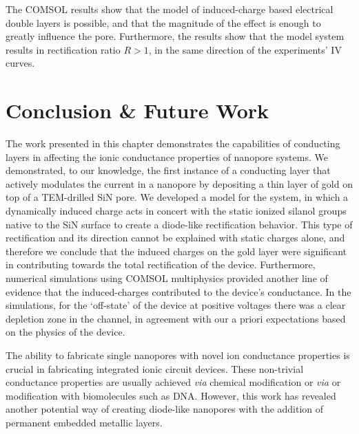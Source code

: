 		The COMSOL results show that the model of induced-charge based electrical double layers is possible, and that the magnitude of the effect is enough to greatly influence the pore. Furthermore, the results show that the model system results in rectification ratio $R>1$, in the same direction of the experiments' IV curves.
		
	\section{Conclusion \& Future Work}
		
		The work presented in this chapter demonstrates the capabilities of conducting layers in affecting the ionic conductance properties of nanopore systems. We demonstrated, to our knowledge, the first instance of a conducting layer that actively modulates the current in a nanopore by depositing a thin layer of gold on top of a TEM-drilled SiN pore. We developed a model for the system, in which a dynamically induced charge acts in concert with the static ionized silanol groups native to the SiN surface to create a diode-like rectification behavior. This type of rectification and its direction cannot be explained with static charges alone, and therefore we conclude that the induced charges on the gold layer were significant in contributing towards the total rectification of the device. Furthermore, numerical simulations using COMSOL multiphysics provided another line of evidence that the induced-charges contributed to the device's conductance. In the simulations, for the `off-state' of the device at positive voltages there was a clear depletion zone in the channel, in agreement with our a priori expectations based on the physics of the device. 
		
		The ability to fabricate single nanopores with novel ion conductance properties is crucial in fabricating integrated ionic circuit devices. These non-trivial conductance properties are usually achieved \textit{via} chemical modification or \textit{via} or modification with biomolecules such as DNA. However, this work has revealed another potential way of creating diode-like nanopores with the addition of permanent embedded metallic layers. 
		
		
		
			
			
		
			
		
			
	
		
		
		
		
	

	





